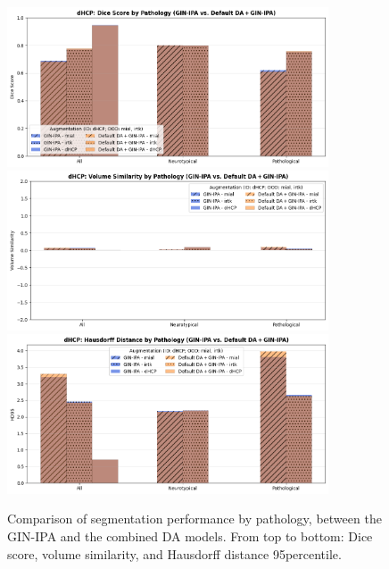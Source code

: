 \begin{figure}[htbp]
  \centering
  \includegraphics[width=0.85\textwidth]{figures/2_pathology_DC.png} \\
  \vspace{10pt}
  \includegraphics[width=0.85\textwidth]{figures/2_pathology_VS.png} \\
  \vspace{10pt}
  \includegraphics[width=0.85\textwidth]{figures/2_pathology_HD.png}
  \caption{Comparison of segmentation performance by pathology, between the GIN-IPA and the combined DA models. From top to bottom: Dice score, volume similarity, and Hausdorff distance 95\th percentile.}
  \label{fig:pathology_summary_2}
\end{figure}
